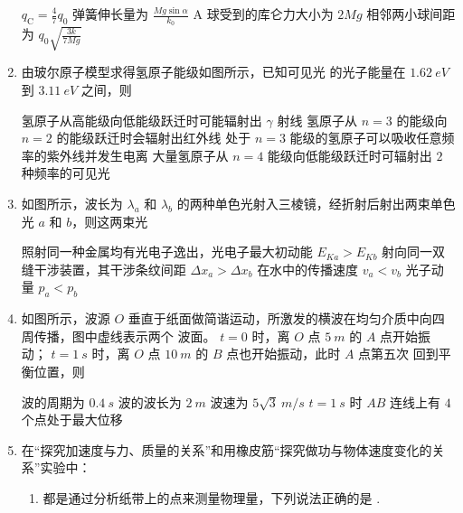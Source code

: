 \begin{enumerate}
\fourchoices
{$q_{\mathrm{C}}=\frac{4}{7} q_{0}$}
{弹簧伸长量为 $\frac{M g \sin \alpha}{k_{0}}$}
{A 球受到的库仑力大小为 $2 M g$}
{相邻两小球间距为 $q_{0} \sqrt{\frac{3 k}{7 M g}}$}




\item
由玻尔原子模型求得氢原子能级如图所示，已知可见光 的光子能量在 $ 1.62 \ eV $ 到 $ 3.11 \ eV $ 之间，则  
\begin{figure}[h!]
\centering

\end{figure}


\fourchoices
{氢原子从高能级向低能级跃迁时可能辐射出 $ \gamma $ 射线}
{氢原子从 $ n=3 $ 的能级向 $ n=2 $ 的能级跃迁时会辐射出红外线}
{处于 $ n=3 $ 能级的氢原子可以吸收任意频率的紫外线并发生电离}
{大量氢原子从 $ n=4 $ 能级向低能级跃迁时可辐射出 $ 2 $ 种频率的可见光}



\item
如图所示，波长为 $ \lambda_{a} $ 和 $ \lambda_{b} $ 的两种单色光射入三棱镜，经折射后射出两束单色光 $ a $ 和 $ b $，则这两束光  
\begin{figure}[h!]
\centering

\end{figure}


\fourchoices
{照射同一种金属均有光电子逸出，光电子最大初动能 $ E_{Ka}>E_{Kb} $}
{射向同一双缝干涉装置，其干涉条纹间距 $ \Delta x_a> \Delta x_b $}
{在水中的传播速度 $ v_a<v_b $}
{光子动量 $ p_a<p_b $}


\item
如图所示，波源 $ O $ 垂直于纸面做简谐运动，所激发的横波在均匀介质中向四周传播，图中虚线表示两个
波面。 $ t=0 $ 时，离 $ O $ 点 $ 5 \ m $ 的 $ A $ 点开始振动； $ t=1 \ s $ 时，离 $ O $ 点 $ 10 \ m $ 的 $ B $ 点也开始振动，此时 $ A $ 点第五次
回到平衡位置，则  
\begin{figure}[h!]
\centering

\end{figure}

\fourchoices
{波的周期为 $ 0.4 \ s $}
{波的波长为 $ 2 \ m $}
{波速为 $ 5\sqrt{3} \ m/s $}
{$ t=1 \ s $ 时 $ AB $ 连线上有 $ 4 $ 个点处于最大位移}




\gaokaosy


\item
在“探究加速度与力、质量的关系”和用橡皮筋“探究做功与物体速度变化的关系”实验中：
\begin{enumerate}
\item
都是通过分析纸带上的点来测量物理量，下列说法正确的是 \underlinegap .


\end{enumerate}
\end{enumerate}
